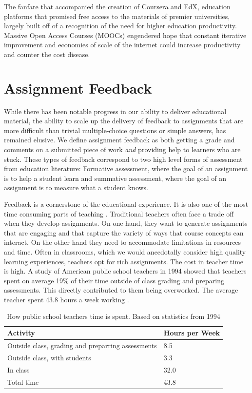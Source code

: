 The fanfare that accompanied the creation of Coursera and EdX, education platforms that promised free access to the materials of premier universities, largely built off of a recognition of the need for higher education productivity. Massive Open Access Courses (MOOCs) engendered hope that constant iterative
improvement and economies of scale of the internet could increase productivity and counter the cost disease.

\section{Assignment Feedback}

While there has been notable progress in our ability to deliver educational material, the ability to scale up the delivery of feedback to assignments that are more difficult than trivial multiple-choice questions or simple answers, has remained elusive. We define assignment feedback as both getting a grade and comments on a submitted piece of work \emph{and} providing help to learners who are stuck. These types of feedback correspond to two high level forms of assessment from education literature: Formative assessment, where the goal of an assignment is to help a student learn and summative assessment, where the goal of an assignment is to measure what a student knows.

Feedback is a cornerstone of the educational experience. It is also one of the most time consuming parts of teaching \cite{sadler2006impact}. Traditional teachers often face a trade off when they develop assignments. On one hand, they want to generate assignments that are engaging and that capture the variety of ways that course concepts can interact. On the other hand they need to accommodate limitations in resources and time. Often in classrooms, which we would anecdotally consider high quality learning experiences, teachers opt for rich assignments. The cost in teacher time is high. A study of American public school teachers in 1994 showed that teachers spent on average 19\% of their time outside of class grading and preparing assessments. This directly contributed to them being overworked. The average teacher spent 43.8 hours a week working \cite{henke1996schools}.

\begin{table}[t]
 \centering
 \begin{tabular}{ l l }
 \toprule
	Activity & Hours per Week \\
   \midrule
   Outside class, grading and preparring assessments & 8.5 \\
  Outside class, with students & 3.3 \\
  In class & 32.0 \\
  Total time & 43.8 \\
  \bottomrule
  \end{tabular}
  \caption[Teacher time]{How public school teachers time is spent. Based on statistics from 1994 \cite{henke1996schools}}
 \label{tab:dataTable}
\end{table}

